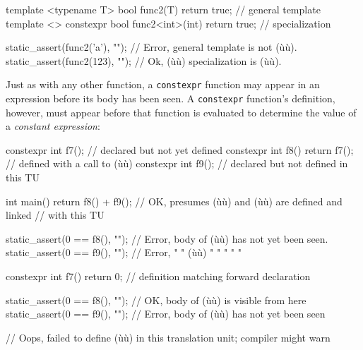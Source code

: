 \begin{emcppslisting}
template <typename T> bool func2(T)        { return true; }  // general template
template <> constexpr bool func2<int>(int) { return true; }  // specialization

static_assert(func2('a'), "");  // Error, general template is not (ù{}ù).
static_assert(func2(123), "");  // Ok, (ù{}ù) specialization is (ù{}ù).
\end{emcppslisting}
    

\noindent Just as with any other function, a \lstinline!constexpr! function may
appear in an expression before its body has been seen. A
\lstinline!constexpr! function's definition, however, must appear before
that function is evaluated to determine the value of a \emph{constant
expression}:

\begin{emcppslisting}
constexpr int f7();                  // declared but not yet defined
constexpr int f8() { return f7(); }  // defined with a call to (ù{}ù)
constexpr int f9();                  // declared but not defined in this TU

int main()
{
    return f8() + f9();  // OK, presumes (ù{}ù) and (ù{}ù) are defined and linked
                         // with this TU
}

static_assert(0 == f8(), "");  // Error, body of (ù{}ù) has not yet been seen.
static_assert(0 == f9(), "");  // Error,   "  "  (ù{}ù)  "   "   "   "     "

constexpr int f7() { return 0; }  // definition matching forward declaration

static_assert(0 == f8(), "");  // OK, body of (ù{}ù) is visible from here
static_assert(0 == f9(), "");  // Error, body of (ù{}ù) has not yet been seen

// Oops, failed to define (ù{}ù) in this translation unit; compiler might warn
\end{emcppslisting}
    

